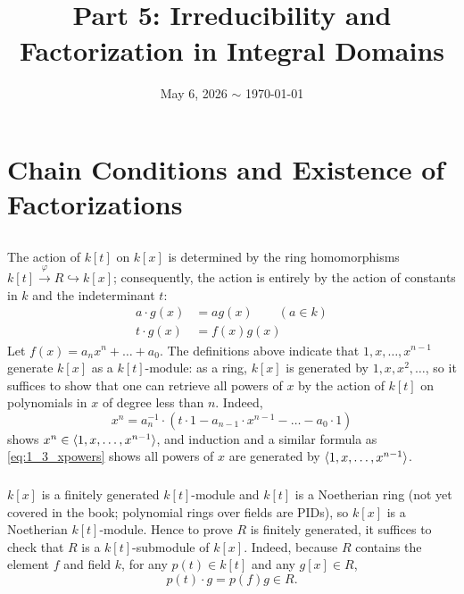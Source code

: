 \documentclass[12pt]{article}
\title{\course\ \\ Part 5: Irreducibility and Factorization in Integral Domains}
\author{\myname}
\date{May 6, 2026 $\sim$ \today}
\begin{document}
\maketitle
\thispagestyle{fancy}

\newcommand{\dirsum}[2]{#1^{\oplus#2}}
\newcommand{\rmod}[1]{#1\text{-module}\xspace}
\newcommand{\idealp}{\mathfrak{p}}
\newcommand{\idealq}{\mathfrak{q}}
\newcommand{\idealm}{\mathfrak{m}} 


\section{Chain Conditions and Existence of Factorizations} 
\setcounter{subsection}{2} 
\subsection{} 
\subsubsection{} 
The action of $k[t]$ on $k[x]$ is determined by the ring homomorphisms $k[t] \overset{\varphi}{\rightarrow} R \hookrightarrow k[x]$; 
consequently, the action is entirely by the action of constants in $k$ and the indeterminant $t$: 
\begin{align*}
  a \cdot g(x) & = ag(x) \hspace{2em} (a \in k) \\ 
  t \cdot g(x) & = f(x) g(x) 
\end{align*}
Let $f(x) = a_n x^n + \ldots + a_0$. 
The definitions above indicate that $1, x, \ldots, x^{n - 1}$ generate $k[x]$ as a $\rmod{k[t]}$: 
as a ring, $k[x]$ is generated by $1, x, x^2, \ldots$, so it suffices to show that one can retrieve all powers of $x$ by the action of $k[t]$ on polynomials in $x$ of degree less than $n$. 
Indeed, 
\begin{equation} \label{eq:1_3_xpowers}
  x^n = a_{n}^{-1} \cdot (t \cdot 1 - a_{n - 1} \cdot x^{n - 1} - \ldots - a_0 \cdot 1) 
\end{equation}
shows $x^n \in \langle1, x, \ldots, x^{n - 1}\rangle$, and induction and a similar formula as \eqref{eq:1_3_xpowers} shows all powers of $x$ are generated by $\langle1, x, \ldots, x^{n - 1}\rangle$. 

\subsubsection{}
$k[x]$ is a finitely generated $\rmod{k[t]}$ and $k[t]$ is a Noetherian ring (not yet covered in the book;
polynomial rings over fields are PIDs), 
so $k[x]$ is a Noetherian $\rmod{k[t]}$. 
Hence to prove $R$ is finitely generated, it suffices to check that $R$ is a $k[t]$-submodule of $k[x]$. 
Indeed, because $R$ contains the element $f$ and field $k$, for any $p(t) \in k[t]$ and any $g[x] \in R$, 
$$p(t) \cdot g = p(f) g \in R.$$
\end{document}
